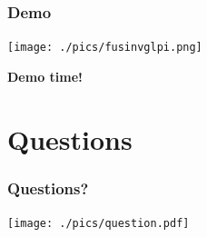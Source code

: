 \documentclass{beamer}
\begin{document}
%
%




\begin{frame}
    \frametitle{Demo}

   \texttt{[image: ./pics/fusinvglpi.png]}

    \bf{Demo time!}
\end{frame}


\section{Questions}

\begin{frame}
    \frametitle{Questions?}

    \begin{center}

    \texttt{[image: ./pics/question.pdf]}

    \end{center}

\end{frame}
\end{document}
